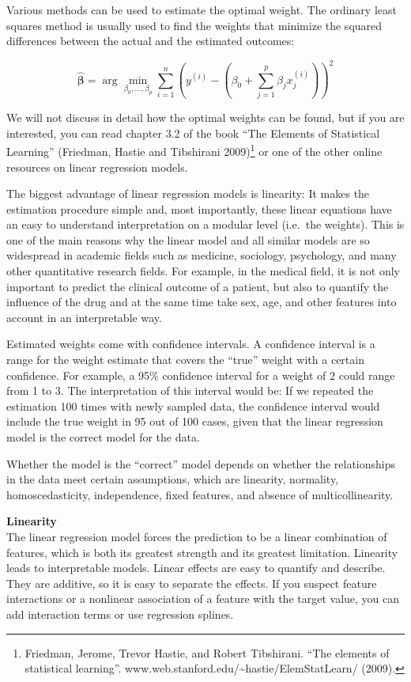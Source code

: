 \documentclass[
  11pt,
]{scrbook}
\begin{document}
Various methods can be used to estimate the optimal weight.
The ordinary least squares method is usually used to find the weights that minimize the squared differences between the actual and the estimated outcomes:

\[\hat{\boldsymbol{\beta}}=\arg\!\min_{\beta_0,\ldots,\beta_p}\sum_{i=1}^n\left(y^{(i)}-\left(\beta_0+\sum_{j=1}^p\beta_jx^{(i)}_{j}\right)\right)^{2}\]

We will not discuss in detail how the optimal weights can be found, but if you are interested, you can read chapter 3.2 of the book ``The Elements of Statistical Learning'' (Friedman, Hastie and Tibshirani 2009)\footnote{Friedman, Jerome, Trevor Hastie, and Robert Tibshirani. ``The elements of statistical learning''. www.web.stanford.edu/\textasciitilde hastie/ElemStatLearn/ (2009).} or one of the other online resources on linear regression models.

The biggest advantage of linear regression models is linearity:
It makes the estimation procedure simple and, most importantly, these linear equations have an easy to understand interpretation on a modular level (i.e.~the weights).
This is one of the main reasons why the linear model and all similar models are so widespread in academic fields such as medicine, sociology, psychology, and many other quantitative research fields.
For example, in the medical field, it is not only important to predict the clinical outcome of a patient, but also to quantify the influence of the drug and at the same time take sex, age, and other features into account in an interpretable way.

Estimated weights come with confidence intervals.
A confidence interval is a range for the weight estimate that covers the ``true'' weight with a certain confidence.
For example, a 95\% confidence interval for a weight of 2 could range from 1 to 3.
The interpretation of this interval would be:
If we repeated the estimation 100 times with newly sampled data, the confidence interval would include the true weight in 95 out of 100 cases, given that the linear regression model is the correct model for the data.

Whether the model is the ``correct'' model depends on whether the relationships in the data meet certain assumptions, which are linearity, normality, homoscedasticity, independence, fixed features, and absence of multicollinearity.

\textbf{Linearity}\\
The linear regression model forces the prediction to be a linear combination of features, which is both its greatest strength and its greatest limitation.
Linearity leads to interpretable models.
Linear effects are easy to quantify and describe.
They are additive, so it is easy to separate the effects.
If you suspect feature interactions or a nonlinear association of a feature with the target value, you can add interaction terms or use regression splines.
\end{document}

